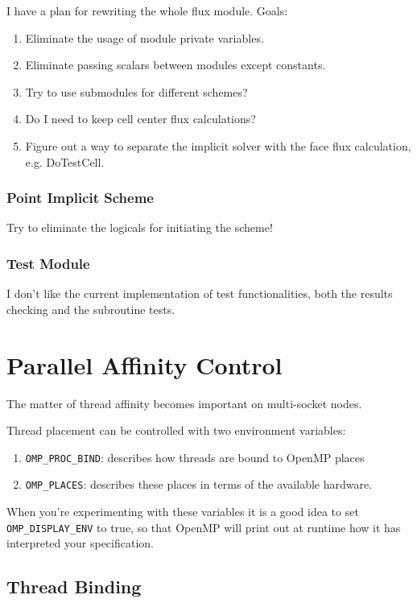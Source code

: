 \documentclass[11pt]{book} %
\begin{document}
I have a plan for rewriting the whole flux module. Goals:
\begin{enumerate}
\item Eliminate the usage of module private variables.
\item Eliminate passing scalars between modules except constants.
\item Try to use submodules for different schemes?
\item Do I need to keep cell center flux calculations?
\item Figure out a way to separate the implicit solver with the face flux calculation, e.g. DoTestCell.
\end{enumerate}

\subsection{Point Implicit Scheme}

Try to eliminate the logicals for initiating the scheme!

\subsection{Test Module}

I don't like the current implementation of test functionalities, both the results checking and the subroutine tests.

\chapter{Parallel Affinity Control}

The matter of thread affinity becomes important on multi-socket nodes.

Thread placement can be controlled with two environment variables:
\begin{enumerate}
\item \verb|OMP_PROC_BIND|: describes how threads are bound to OpenMP places
\item \verb|OMP_PLACES|: describes these places in terms of the available hardware.
\end{enumerate}

When you're experimenting with these variables it is a good idea to set \verb|OMP_DISPLAY_ENV| to true, so that OpenMP will print out at runtime how it has interpreted your specification.

\section{Thread Binding}
\end{document}
